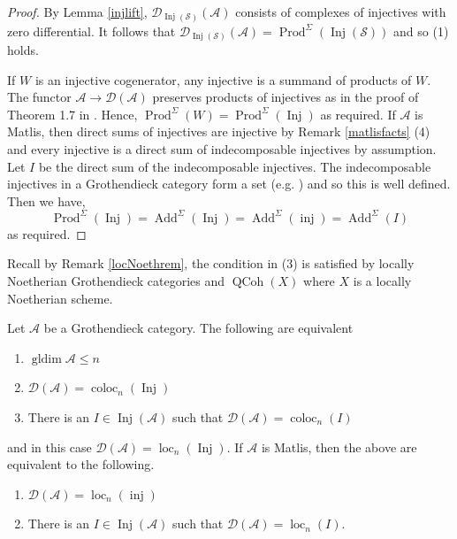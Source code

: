 \documentclass[12pt,oneside]{amsart}
\DeclareMathOperator*{\Inj}{Inj}
\DeclareMathOperator{\coloc}{coloc}
\DeclareMathOperator{\loc}{loc}
\DeclareMathOperator{\QCoh}{QCoh}
\DeclareMathOperator{\gldim}{gldim}
\DeclareMathOperator{\inj}{inj}
\DeclareMathOperator{\Add}{Add}
\DeclareMathOperator{\Prod}{Prod}
\begin{document}
\begin{proof}
By Lemma \ref{injlift}, $\mathcal{D}_{\Inj(\mathcal{S})}(\mathcal{A})$ consists of complexes of injectives with zero differential. It follows that $\mathcal{D}_{\Inj(\mathcal{S})}(\mathcal{A}) = \Prod^\Sigma(\Inj(\mathcal{S}))$ and so (1) holds. 

If $W$ is an injective cogenerator, any injective is a summand of products of $W$. The functor $\mathcal{A} \to \mathcal{D}(\mathcal{A})$ preserves products of injectives as in the proof of Theorem 1.7 in \cite{Sto13}. Hence,
$\Prod^{\Sigma}(W) = \Prod^{\Sigma}(\Inj)$ as required. If $\mathcal{A}$ is Matlis, then direct sums of injectives are injective by Remark \ref{matlisfacts} (4) and every injective is a direct sum of indecomposable injectives by assumption. Let $I$ be the direct sum of the indecomposable injectives. The indecomposable injectives in a Grothendieck category form a set (e.g. \cite[pp. 9]{HPV25}) and so this is well defined. Then we have, 
\[
\Prod^{\Sigma}(\Inj) = \Add^\Sigma(\Inj) = \Add^\Sigma(\inj) = \Add^\Sigma(I)
\]
as required. 
\end{proof}

\begin{remark}
Recall by Remark \ref{locNoethrem}, the condition in (3) is satisfied by locally Noetherian Grothendieck categories and $\QCoh(X)$ where $X$ is a locally Noetherian scheme. 
\end{remark}

\begin{theorem} \label{bigproductglobdim}
Let $\mathcal{A}$ be a Grothendieck category. The following are equivalent
\begin{enumerate}
\item $\gldim \mathcal{A} \leq n$
\item $\mathcal{D}(\mathcal{A}) = \coloc_n(\Inj)$
\item There is an $I \in \Inj(\mathcal{A})$ such that $\mathcal{D}(\mathcal{A}) = \coloc_n(I)$
\end{enumerate}
and in this case $\mathcal{D}(\mathcal{A}) = \loc_n(\Inj)$. If $\mathcal{A}$ is Matlis, then the above are equivalent to the following.
\begin{enumerate}

\item[(4)] $\mathcal{D}(\mathcal{A}) = \loc_n(\inj)$

\item[(5)] There is an $I \in \Inj(\mathcal{A})$ such that $\mathcal{D}(\mathcal{A}) = \loc_n(I)$. 
\end{enumerate}
\end{theorem}
\end{document}
